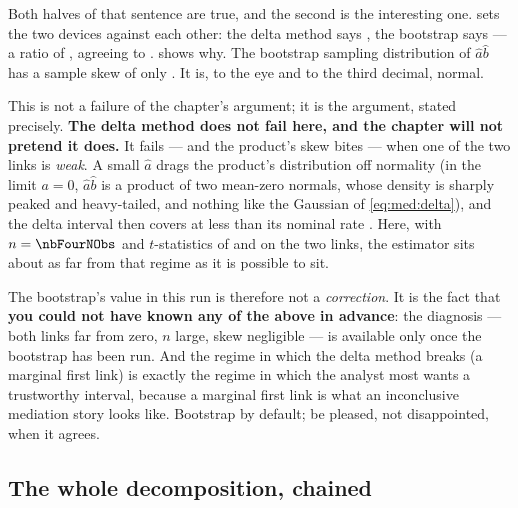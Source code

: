 Both halves of that sentence are true, and the second is the interesting one. 
sets the two devices against each other: the delta method says \nbFourSeDelta, the bootstrap says
\nbFourSeBoot{} --- a ratio of \nbFourSeRatio, agreeing to \pc{\nbFourSeGapPct}.
 shows why. The bootstrap sampling distribution of $\hat a\hat b$ has a sample
skew of only \nbFourNieBootSkew. It is, to the eye and to the third decimal, normal.



This is not a failure of the chapter's argument; it is the argument, stated precisely. \textbf{The
delta method does not fail here, and the chapter will not pretend it does.} It fails --- and the
product's skew bites --- when one of the two links is \emph{weak}. A small $\hat a$ drags the
product's distribution off normality (in the limit $a = 0$, $\hat a \hat b$ is a product of two
mean-zero normals, whose density is sharply peaked and heavy-tailed, and nothing like the Gaussian
of \cref{eq:med:delta}), and the delta interval then covers at less than its nominal rate
\citep{mackinnon2002, loeys2015}. Here, with $n = \nbFourNObs$ and $t$-statistics of \nbFourBkAT{}
and \nbFourBkBT{} on the two links, the estimator sits about as far from that regime as it is
possible to sit.

The bootstrap's value in this run is therefore not a \emph{correction}. It is the fact that
\textbf{you could not have known any of the above in advance}: the diagnosis --- both links far from
zero, $n$ large, skew negligible --- is available only once the bootstrap has been run. And the
regime in which the delta method breaks (a marginal first link) is exactly the regime in which the
analyst most wants a trustworthy interval, because a marginal first link is what an inconclusive
mediation story looks like. Bootstrap by default; be pleased, not disappointed, when it agrees.

\subsection*{The whole decomposition, chained}

